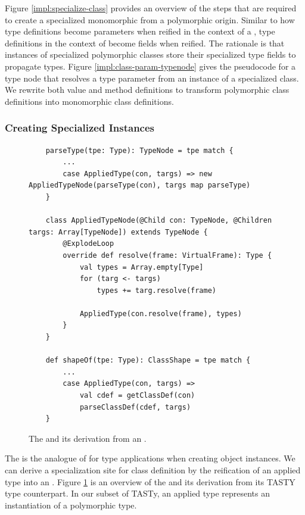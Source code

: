 Figure \ref{impl:specialize-class} provides an overview of the steps that are required to create a specialized monomorphic  from a polymorphic origin.
Similar to how type definitions become parameters when reified in the context of a , type definitions in the context of  become fields when reified.
The rationale is that instances of specialized polymorphic classes store their specialized type fields to propagate types.
Figure \ref{impl:class-param-typenode} gives the pseudocode for a type node that resolves a type parameter from an instance of a specialized class.
We rewrite both value and method definitions to transform polymorphic class definitions into monomorphic class definitions.

\subsubsection*{Creating Specialized Instances}

\begin{figure}[!htb]
	\begin{verbatim}
	parseType(tpe: Type): TypeNode = tpe match {
		...
		case AppliedType(con, targs) => new AppliedTypeNode(parseType(con), targs map parseType) 
	}

	class AppliedTypeNode(@Child con: TypeNode, @Children targs: Array[TypeNode]) extends TypeNode {
		@ExplodeLoop
		override def resolve(frame: VirtualFrame): Type {
			val types = Array.empty[Type]
			for (targ <- targs)
				types += targ.resolve(frame)
			
			AppliedType(con.resolve(frame), types)
		}
	}

	def shapeOf(tpe: Type): ClassShape = tpe match {
		...
		case AppliedType(con, targs) => 
			val cdef = getClassDef(con)
			parseClassDef(cdef, targs)
	}
	\end{verbatim}
	\caption{The  and its derivation from an .}
	\label{impl:applied-type-node}
\end{figure}

The  is the analogue of  for type applications when creating object instances.
We can derive a specialization site for class definition by the reification of an applied type into an .
Figure \ref{impl:applied-type-node} is an overview of the  and its derivation from its TASTY type counterpart.
In our subset of TASTy, an applied type represents an instantiation of a polymorphic type.

